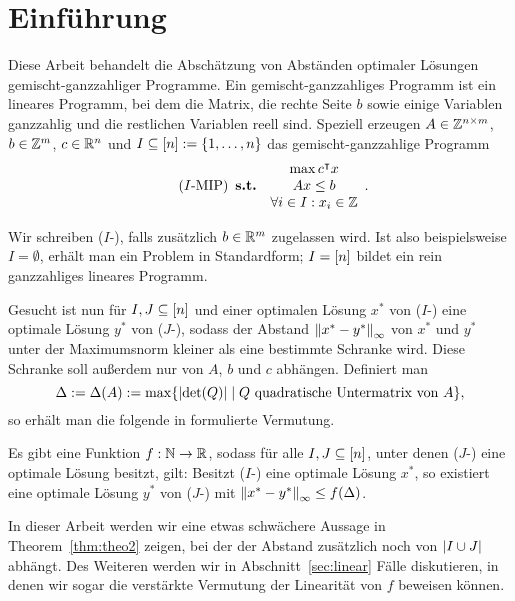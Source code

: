 \section{Einführung}\label{introduction}

Diese Arbeit behandelt die Abschätzung von Abständen optimaler Lösungen
gemischt-ganzzahliger Programme.
Ein gemischt-ganzzahliges Programm ist ein lineares Programm, bei dem die
Matrix, die rechte Seite $b$ sowie einige Variablen ganzzahlig und die
restlichen Variablen reell sind.
Speziell erzeugen $A\in\mathbb{Z}^{n\times m}$, $b\in\mathbb{Z}^m$, $c\in\mathbb{R}^n$ und $I\subseteq[n]:=\{1,\dots,n\}$ das gemischt-ganzzahlige Programm
\begin{equation}\tag{$I$-\MIPI}
\begin{array}{lc}
	&\max c\transpose x \\
	\subjectTo &Ax\leq b\\
	&\forall i\in I: x_i\in\Z
\end{array}.
\end{equation}

Wir schreiben ($I$-\MIPR), falls zusätzlich $b\in\mathbb{R}^m$ zugelassen wird.
Ist also beispielsweise $I=\emptyset$, erhält man ein Problem in Standardform; $I=[n]$ bildet ein rein ganzzahliges lineares Programm.

Gesucht ist nun für $I,J\subseteq[n]$ und einer optimalen Lösung
$x^*$ von ($I$-\MIPI) eine optimale Lösung $y^*$ von ($J$-\MIPI), sodass der Abstand $\left\lVert x^*-y^*\right\rVert_\infty$ von $x^*$ und $y^*$ unter der Maximumsnorm kleiner als eine bestimmte Schranke wird.
Diese Schranke soll außerdem nur von $A$, $b$ und $c$ abhängen.
Definiert man
$$\Delta:=\Delta(A):=\max\{\lvert  \det(Q) \rvert \mid Q \text{ quadratische Untermatrix von } A \},$$
so erhält man die folgende in \cite{Paat2018} formulierte Vermutung.

\begin{conjecture}\label{con:delta}
	Es gibt eine Funktion $f: \mathbb{N}\rightarrow\mathbb{R}$, sodass für alle $I,J\subseteq[n]$, unter denen ($J$-\MIPI) eine optimale Lösung besitzt, gilt:
	Besitzt ($I$-\MIPI) eine optimale Lösung $x^*$, so existiert eine optimale 
	Lösung $y^*$ von ($J$-\MIPI) mit $\left\lVert x^* - y^*\right\rVert_\infty\leq f(\Delta)$.
\end{conjecture}

In dieser Arbeit werden wir eine etwas schwächere Aussage in Theorem~\ref{thm:theo2} zeigen, bei der der Abstand zusätzlich noch von $\lvert I\cup J \rvert$ abhängt.
Des Weiteren werden wir in Abschnitt~\ref{sec:linear} Fälle diskutieren, in denen wir sogar die verstärkte Vermutung der Linearität von $f$ beweisen können.
